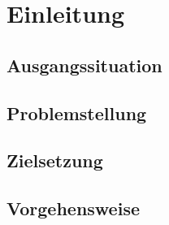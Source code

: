 
\chapter{Einleitung}
\section{Ausgangssituation}
\section{Problemstellung}
\section{Zielsetzung}
\section{Vorgehensweise}

